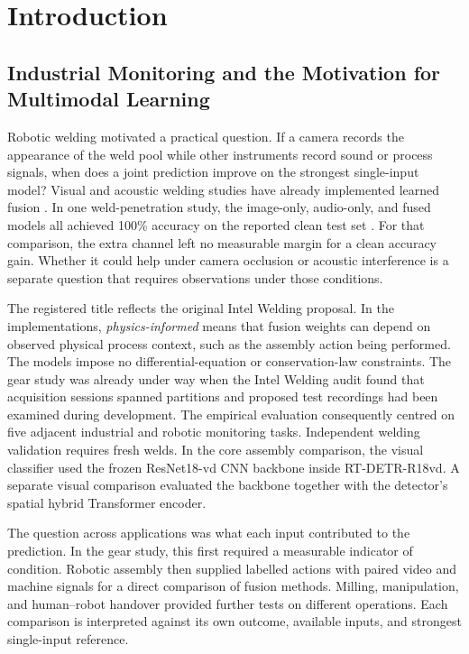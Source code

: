 \chapter{Introduction}
\label{ch:introduction}

\section{Industrial Monitoring and the Motivation for Multimodal Learning}
Robotic welding motivated a practical question. If a camera records the appearance of the weld pool while other instruments record sound or process signals, when does a joint prediction improve on the strongest single-input model? Visual and acoustic welding studies have already implemented learned fusion \citep{P003,Hua2026Weld}. In one weld-penetration study, the image-only, audio-only, and fused models all achieved 100\% accuracy on the reported clean test set \citep[Tables~1--3]{Hua2026Weld}. For that comparison, the extra channel left no measurable margin for a clean accuracy gain. Whether it could help under camera occlusion or acoustic interference is a separate question that requires observations under those conditions.

The registered title reflects the original Intel Welding proposal. In the implementations, \textit{physics-informed} means that fusion weights can depend on observed physical process context, such as the assembly action being performed. The models impose no differential-equation or conservation-law constraints. The gear study was already under way when the Intel Welding audit found that acquisition sessions spanned partitions and proposed test recordings had been examined during development. The empirical evaluation consequently centred on five adjacent industrial and robotic monitoring tasks. Independent welding validation requires fresh welds. In the core assembly comparison, the visual classifier used the frozen ResNet18-vd CNN backbone inside RT-DETR-R18vd. A separate visual comparison evaluated the backbone together with the detector's spatial hybrid Transformer encoder.

The question across applications was what each input contributed to the prediction. In the gear study, this first required a measurable indicator of condition. Robotic assembly then supplied labelled actions with paired video and machine signals for a direct comparison of fusion methods. Milling, manipulation, and human--robot handover provided further tests on different operations. Each comparison is interpreted against its own outcome, available inputs, and strongest single-input reference.

